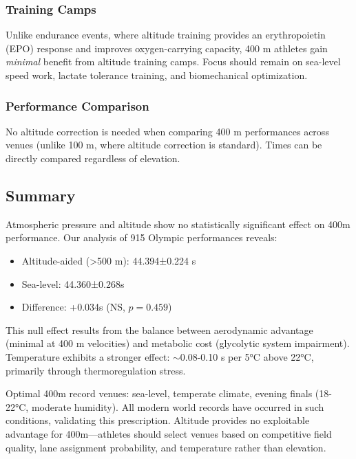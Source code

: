 \subsubsection{Training Camps}

Unlike endurance events, where altitude training provides an erythropoietin (EPO) response and improves oxygen-carrying capacity, 400 m athletes gain \textit{minimal} benefit from altitude training camps. Focus should remain on sea-level speed work, lactate tolerance training, and biomechanical optimization.

\subsubsection{Performance Comparison}

No altitude correction is needed when comparing 400 m performances across venues (unlike 100 m, where altitude correction is standard). Times can be directly compared regardless of elevation.

\subsection{Summary}

Atmospheric pressure and altitude show no statistically significant effect on 400m performance. Our analysis of 915 Olympic performances reveals:
\begin{itemize}
    \item Altitude-aided (>500 m): 44.394±0.224 s
    \item Sea-level: 44.360±0.268s
    \item Difference: +0.034s (NS, $p=0.459$)
\end{itemize}

This null effect results from the balance between aerodynamic advantage (minimal at 400 m velocities) and metabolic cost (glycolytic system impairment). Temperature exhibits a stronger effect: $\sim$0.08-0.10 s per 5°C above 22°C, primarily through thermoregulation stress.

Optimal 400m record venues: sea-level, temperate climate, evening finals (18-22°C, moderate humidity). All modern world records have occurred in such conditions, validating this prescription. Altitude provides no exploitable advantage for 400m—athletes should select venues based on competitive field quality, lane assignment probability, and temperature rather than elevation.
